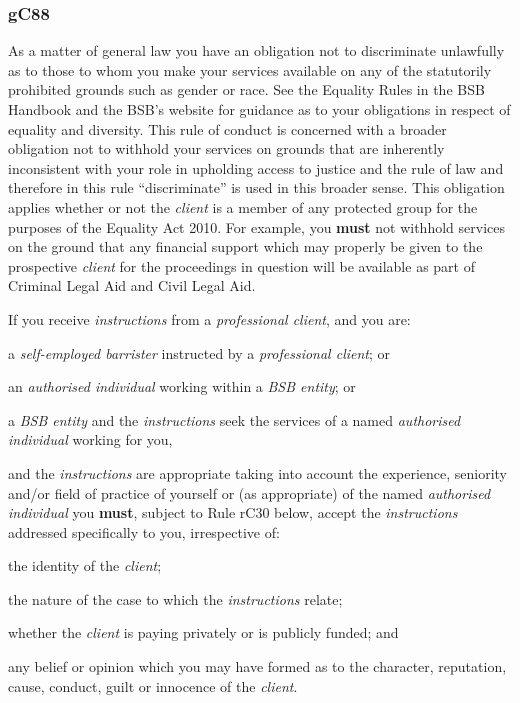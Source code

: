 

\subsubsection{\color{darkgrey}gC88}

As a matter of general law you have an obligation not to discriminate
unlawfully as to those to whom you make your services available on any
of the statutorily prohibited grounds such as gender or race. See the
Equality Rules in the BSB Handbook and the BSB's website for guidance as
to your obligations in respect of equality and diversity. This rule of
conduct is concerned with a broader obligation not to withhold your
services on grounds that are inherently inconsistent with your role in
upholding access to justice and the rule of law and therefore in this
rule ``discriminate'' is used in this broader sense. This obligation
applies whether or not the \emph{client} is a member of any protected
group for the purposes of the Equality Act 2010. For example, you \textcolor{myred}{\textbf{must}}
not withhold services on the ground that any financial support which may
properly be given to the prospective \emph{client} for the proceedings
in question will be available as part of Criminal Legal Aid and Civil
Legal Aid.




If you receive \emph{instructions} from a \emph{professional client},
and you are:
\begin{numlist}
\item a \emph{self-employed barrister} instructed by a \emph{professional
client}; or

\item an \emph{authorised individual} working within a \emph{BSB entity};
or

\item a \emph{BSB entity} and the \emph{instructions} seek the services of
a named \emph{authorised individual} working for you,

and the \emph{instructions} are appropriate taking into account the
experience, seniority and/or field of practice of yourself or (as
appropriate) of the named \emph{authorised individual} you \textcolor{myred}{\textbf{must}}, subject
to Rule rC30 below, accept the \emph{instructions} addressed
specifically to you, irrespective of:
\begin{alphlist}
\item the identity of the \emph{client};

\item the nature of the case to which the \emph{instructions} relate;

\item whether the \emph{client} is paying privately or is publicly funded;
and

\item any belief or opinion which you may have formed as to the character,
reputation, cause, conduct, guilt or innocence of the \emph{client}.
\end{alphlist}
\end{numlist}

